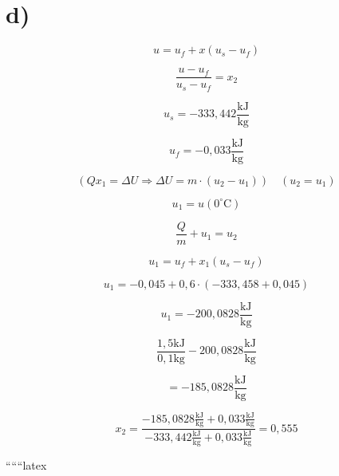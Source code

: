 

\section*{d)}

\[
u = u_f + x(u_s - u_f)
\]

\[
\frac{u - u_f}{u_s - u_f} = x_2
\]

\[
u_s = -333{,}442 \frac{\text{kJ}}{\text{kg}}
\]

\[
u_f = -0{,}033 \frac{\text{kJ}}{\text{kg}}
\]

\[
(Q x_1 = \Delta U \Rightarrow \Delta U = m \cdot (u_2 - u_1)) \quad (u_2 = u_1)
\]

\[
u_1 = u(0^\circ \text{C})
\]

\[
\frac{Q}{m} + u_1 = u_2
\]

\[
u_1 = u_f + x_1 (u_s - u_f)
\]

\[
u_1 = -0{,}045 + 0{,}6 \cdot (-333{,}458 + 0{,}045)
\]

\[
u_1 = -200{,}0828 \frac{\text{kJ}}{\text{kg}}
\]

\[
\frac{1{,}5 \text{kJ}}{0{,}1 \text{kg}} - 200{,}0828 \frac{\text{kJ}}{\text{kg}}
\]

\[
= -185{,}0828 \frac{\text{kJ}}{\text{kg}}
\]

\[
x_2 = \frac{-185{,}0828 \frac{\text{kJ}}{\text{kg}} + 0{,}033 \frac{\text{kJ}}{\text{kg}}}{-333{,}442 \frac{\text{kJ}}{\text{kg}} + 0{,}033 \frac{\text{kJ}}{\text{kg}}} = 0{,}555
\]

``````latex